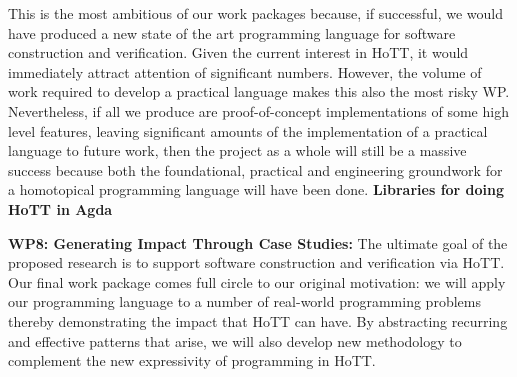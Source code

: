 \documentclass[a4paper,11pt]{article}
\begin{document}
This is the most ambitious of our work packages because, if successful,
we would have produced a new state of the art programming language for
software construction and verification. Given the current interest in
HoTT, it would immediately attract attention of significant
numbers. However, the volume of work required to develop a practical
language makes this also the most risky WP. Nevertheless, if all we
produce are proof-of-concept implementations of some high level
features, leaving significant amounts of the implementation of a
practical language to future work, then the project as a whole will
still be a massive success because both the foundational, practical
and engineering groundwork for a homotopical programming language will
have been done. {\bf Libraries for doing HoTT in Agda}






{\bf WP8: Generating Impact Through Case Studies:} The ultimate goal
of the proposed research is to support software construction and
verification via HoTT. Our final work package comes full circle to our
original motivation: we will apply our programming language to a
number of real-world programming problems thereby demonstrating the
impact that HoTT can have. By abstracting recurring and effective
patterns that arise, we will also develop new methodology to
complement the new expressivity of programming in HoTT.
\end{document}
